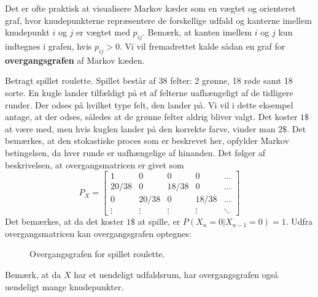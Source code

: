 Det er ofte praktisk at visualisere Markov kæder som en vægtet og orienteret graf, hvor knudepunkterne repræsentere de forskellige udfald og kanterne imellem knudepunkt $i$ og $j$ er vægtet med $p_{ij}$. Bemærk, at kanten imellem $i$ og $j$ kun indtegnes i grafen, hvis $p_{ij} > 0$. Vi vil fremadrettet kalde sådan en graf for \textbf{overgangsgrafen} af Markov kæden.
\begin{example}
  Betragt spillet roulette. Spillet består af 38 felter: 2 grønne, 18 røde samt 18 sorte. En kugle lander tilfældigt på et af felterne uafhængeligt af de tidligere runder. Der odses på hvilket type felt, den lander på. Vi vil i dette eksempel antage, at der odses, således at de grønne felter aldrig bliver valgt. 
  Det koster $1\$$ at være med, men hvis kuglen lander på den korrekte farve, vinder man $2\$$. Det bemærkes, at den stokastiske proces som er beskrevet her, opfylder Markov betingelsen, da hver runde er uafhængelige af hinanden. Det følger af beskrivelsen, at overgangsmatricen er givet som
  \begin{equation} \label{eq:transpositions_graf_roullete}
    P_{X} = \begin{bmatrix}
              1 & 0 & 0 & 0 & \ldots \\
              20 / 38 & 0 & 18 / 38 & 0 & \ldots \\
              0 & 20 / 38 & 0 & 18 / 38 & \ldots \\
              \vdots & \vdots & \vdots & \vdots & \ddots
            \end{bmatrix}
  \end{equation}
  Det bemærkes, at da det koster $1 \$$ at spille, er $P(X_n = 0 | X_{n-1} = 0) = 1$. Udfra overgangsmatricen kan overgangsgrafen optegnes:
  \begin{figure}[H]
    \centering
    \caption{Overgangsgrafen for spillet roulette.}
    \label{fig:transpositions_graf_roullete}
  \end{figure}\noindent
  Bemærk, at da $X$ har et uendeligt udfaldsrum, har overgangsgrafen også uendeligt mange knudepunkter.
\end{example}

